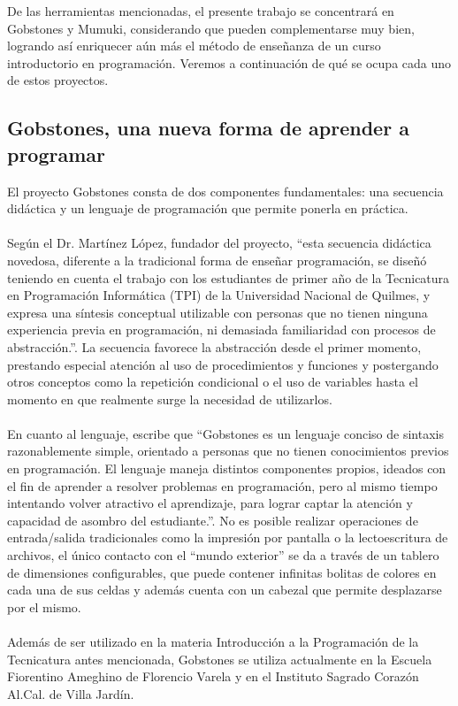 De las herramientas mencionadas, el presente trabajo se concentrará en Gobstones y Mumuki, considerando que pueden complementarse muy bien, logrando así enriquecer aún más el método de enseñanza de un curso introductorio en programación. Veremos a continuación de qué se ocupa cada uno de estos proyectos.

\subsection{Gobstones, una nueva forma de aprender a programar}
El proyecto Gobstones consta de dos componentes fundamentales: una secuencia didáctica y un lenguaje de programación que permite ponerla en práctica.
\\\\
Según el Dr. Martínez López, fundador del proyecto, ``esta secuencia didáctica novedosa, diferente a la tradicional forma de enseñar programación, se diseñó teniendo en cuenta el trabajo con los estudiantes de primer año de la Tecnicatura en Programación Informática (TPI) de la Universidad Nacional de Quilmes, y expresa una síntesis conceptual utilizable con personas que no tienen ninguna experiencia previa en programación, ni demasiada familiaridad con procesos de abstracción.''\cite{LibroGobstones}. La secuencia favorece la abstracción desde el primer momento, prestando especial atención al uso de procedimientos y funciones y postergando otros conceptos como la repetición condicional o el uso de variables hasta el momento en que realmente surge la necesidad de utilizarlos.
\\\\
En cuanto al lenguaje, escribe que ``Gobstones es un lenguaje conciso de sintaxis razonablemente simple, orientado a personas que no tienen conocimientos previos en programación. El lenguaje maneja distintos componentes propios, ideados con el fin de aprender a resolver problemas en programación, pero al mismo tiempo intentando volver atractivo el aprendizaje, para lograr captar la atención y capacidad de asombro del estudiante.''\cite{LibroGobstones}. No es posible realizar operaciones de entrada/salida tradicionales como la impresión por pantalla o la lectoescritura de archivos, el único contacto con el ``mundo exterior'' se da a través de un tablero de dimensiones configurables, que puede contener infinitas bolitas de colores en cada una de sus celdas y además cuenta con un cabezal que permite desplazarse por el mismo.
\\\\
Además de ser utilizado en la materia Introducción a la Programación de la Tecnicatura antes mencionada, Gobstones se utiliza actualmente en la Escuela Fiorentino Ameghino de Florencio Varela y en el Instituto Sagrado Corazón Al.Cal. de Villa Jardín.
